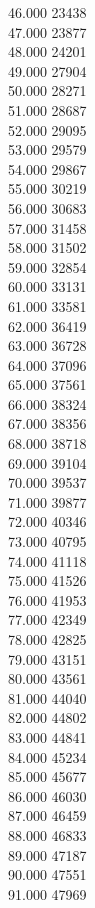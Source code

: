 { 46.000	23438 \\
 47.000	23877 \\
 48.000	24201 \\
 49.000	27904 \\
 50.000	28271 \\
 51.000	28687 \\
 52.000	29095 \\
 53.000	29579 \\
 54.000	29867 \\
 55.000	30219 \\
 56.000	30683 \\
 57.000	31458 \\
 58.000	31502 \\
 59.000	32854 \\
 60.000	33131 \\
 61.000	33581 \\
 62.000	36419 \\
 63.000	36728 \\
 64.000	37096 \\
 65.000	37561 \\
 66.000	38324 \\
 67.000	38356 \\
 68.000	38718 \\
 69.000	39104 \\
 70.000	39537 \\
 71.000	39877 \\
 72.000	40346 \\
 73.000	40795 \\
 74.000	41118 \\
 75.000	41526 \\
 76.000	41953 \\
 77.000	42349 \\
 78.000	42825 \\
 79.000	43151 \\
 80.000	43561 \\
 81.000	44040 \\
 82.000	44802 \\
 83.000	44841 \\
 84.000	45234 \\
 85.000	45677 \\
 86.000	46030 \\
 87.000	46459 \\
 88.000	46833 \\
 89.000	47187 \\
 90.000	47551 \\
 91.000	47969 \\
}
